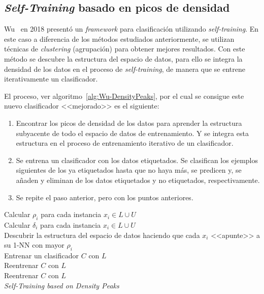 \subsection{\textit{Self-Training} basado en picos de densidad}
Wu~\cite{wu2018self} en 2018 presentó un \textit{framework} para clasificación utilizando \textit{self-training}. En este caso a diferencia de los métodos estudiados anteriormente, se utilizan técnicas de \textit{clustering} (agrupación) para obtener mejores resultados. Con este método se descubre la  estructura del espacio de datos, para ello se integra la densidad de los datos en el proceso de \textit{self-training}, de manera que se entrene iterativamente un clasificador. 

El proceso, ver algoritmo~\ref{alg:Wu-DensityPeaks}, por el cual se consigue este nuevo clasificador <<mejorado>> es el siguiente:
\begin{enumerate}
\item Encontrar los picos de densidad de los datos para aprender la estructura subyacente de todo el espacio de datos de entrenamiento. Y se integra esta estructura en el proceso de entrenamiento iterativo de un clasificador.
\item Se entrena un clasificador con los datos etiquetados. Se clasifican los ejemplos siguientes de los ya etiquetados hasta que no haya más, se predicen y, se añaden y eliminan de los datos etiquetados y no etiquetados, respectivamente.
\item Se repite el paso anterior, pero con los puntos anteriores.
\end{enumerate}

\begin{algorithm}[H]
  	\BlankLine
	Calcular $\rho_i$ para cada instancia $x_i \in L \cup U$\\
	Calcular $\delta_i$ para cada instancia $x_i \in L \cup U$\\
	Descubrir la estructura del espacio de datos haciendo que cada $x_i$ <<apunte>> a su 1-NN con mayor $\rho_i$\\
	Entrenar un clasificador $C$ con $L$\\	
  	Reentrenar $C$ con $L$\\
 	Reentrenar $C$ con $L$\\
	\caption{\textit{Self-Training based on Density Peaks}}\label{alg:Wu-DensityPeaks}
\end{algorithm}


